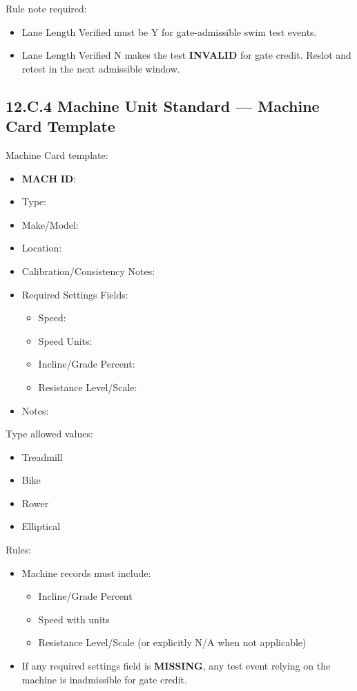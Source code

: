 \documentclass[10pt]{article}
\begin{document}
\begin{landscape}
\endgroup

Rule note required:

\begin{itemize}
\item Lane Length Verified must be Y for gate-admissible swim test events.
\item Lane Length Verified N makes the test \textbf{INVALID} for gate credit. Reslot and retest in the next admissible window.
\end{itemize}

\newpage
\subsection*{12.C.4 Machine Unit Standard — Machine Card Template}
{}

Machine Card template:

\begin{itemize}
\item \textbf{MACH} \textbf{ID}:
\item Type:
\item Make/Model:
\item Location:
\item Calibration/Consistency Notes:
\item Required Settings Fields:
\begin{itemize}
\item Speed:
\item Speed Units:
\item Incline/Grade Percent:
\item Resistance Level/Scale:
\end{itemize}
\item Notes:
\end{itemize}

Type allowed values:

\begin{itemize}
\item Treadmill
\item Bike
\item Rower
\item Elliptical
\end{itemize}

Rules:

\begin{itemize}
\item Machine records must include:
\begin{itemize}
\item Incline/Grade Percent
\item Speed with units
\item Resistance Level/Scale (or explicitly N/A when not applicable)
\end{itemize}
\item If any required settings field is \textbf{MISSING}, any test event relying on the machine is inadmissible for gate credit.
\end{itemize}


\end{landscape}
\end{document}

